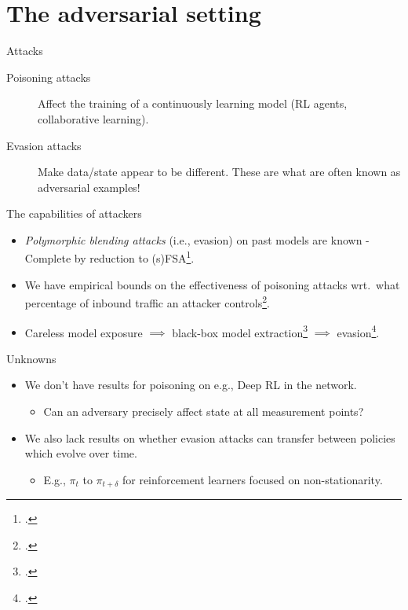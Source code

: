 \documentclass[aspectratio=169,xcolor={dvipsnames}
,hide notes
]{beamer}
\begin{document}
\section{The adversarial setting}

\begin{frame}{Attacks}
	\begin{description}
		\item[Poisoning attacks] Affect the training of a continuously learning model (RL agents, collaborative learning).
		
		\item[Evasion attacks] Make data/state appear to be different. These are what are often known as \alert{adversarial examples}!
	\end{description}
\end{frame}

\begin{frame}{The capabilities of attackers}
	\begin{itemize}
		\item \emph{Polymorphic blending attacks} (i.e., evasion) on past models are known \alert{\NP-Complete} by reduction to (s)FSA\footcite{DBLP:conf/ccs/FoglaL06}.
	
		\item We have empirical bounds on the effectiveness of poisoning attacks wrt.\ what percentage of inbound traffic an attacker controls\footcite{DBLP:journals/jmlr/KloftL10}.
		
		\item Careless model exposure $\implies$ \alert{black-box model extraction}\footcite{DBLP:conf/uss/TramerZJRR16} $\implies$ evasion\footcite{DBLP:conf/sp/Carlini017}.
		
	\end{itemize}
\end{frame}

\begin{frame}{Unknowns}
	\begin{itemize}
		\item We don't have results for poisoning on e.g., Deep RL in the network.
		\begin{itemize}
			\item Can an adversary precisely affect state at all measurement points?
		\end{itemize}
		
		\item We also lack results on whether evasion attacks can transfer between policies which evolve over time.
		\begin{itemize}
			\item E.g., $\pi_t$ to $\pi_{t+\delta}$ for reinforcement learners focused on non-stationarity.
		\end{itemize}
		
	\end{itemize}
\end{frame}
\end{document}
